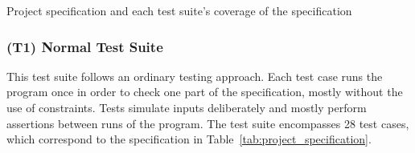 \begin{table}[htpb]
    \caption{Project specification and each test suite's coverage of the specification}
    \label{tab:project_specification}
\end{table}

\subsubsection{(T1) Normal Test Suite}

This test suite follows an ordinary testing approach.
Each test case runs the program once in order to check one part of the specification,
mostly without the use of constraints.
Tests simulate inputs deliberately and mostly perform assertions between runs of the program.
The test suite encompasses 28 test cases, which correspond to the specification in Table~\ref{tab:project_specification}.
\parspace

%
%
%
%
%

